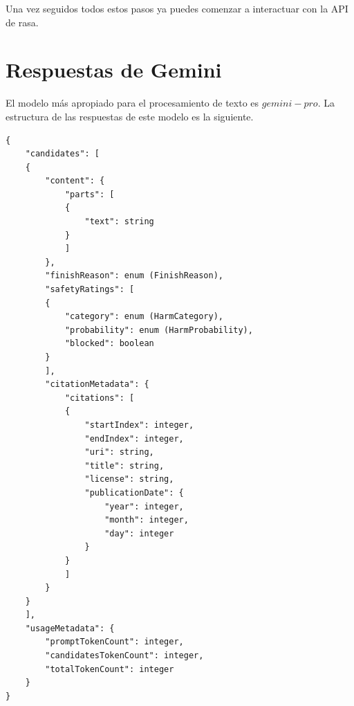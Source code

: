 Una vez seguidos todos estos pasos ya puedes comenzar a interactuar con la API de rasa. 


\section{Respuestas de Gemini}

El modelo más apropiado para el procesamiento de texto es $gemini-pro$. La estructura de las respuestas de este modelo es la siguiente. 

\begin{lstlisting}[style=SpyderStyle, caption={Estructura de una respuesta de Gemini}, captionpos=b, label={lst:python},breaklines = true]
{
	"candidates": [
	{
		"content": {
			"parts": [
			{
				"text": string
			}
			]
		},
		"finishReason": enum (FinishReason),
		"safetyRatings": [
		{
			"category": enum (HarmCategory),
			"probability": enum (HarmProbability),
			"blocked": boolean
		}
		],
		"citationMetadata": {
			"citations": [
			{
				"startIndex": integer,
				"endIndex": integer,
				"uri": string,
				"title": string,
				"license": string,
				"publicationDate": {
					"year": integer,
					"month": integer,
					"day": integer
				}
			}
			]
		}
	}
	],
	"usageMetadata": {
		"promptTokenCount": integer,
		"candidatesTokenCount": integer,
		"totalTokenCount": integer
	}
}
\end{lstlisting}

